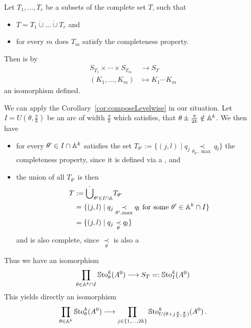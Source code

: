 \begin{cor}\label{cor:composeLevelwise}
  Let $T_1,\dots,T_r$ be a subsets of the complete set $T$, such that
  \begin{itemize}
    \item $T=T_1\dot\cup\dots\dot\cup T_r$ and
    \item for every $m$ does $T_m$ satisfy the completeness property.
  \end{itemize}
  Then is by
  \begin{align*}
    S_{T_1}\times\cdots\times S_{T_m} &\longrightarrow S_T
  \\(K_1,\dots,K_m) &\longmapsto K_1\cdots K_m
  \end{align*}
  an isomorphism defined.
\end{cor}
We can apply the Corollary~\ref{cor:composeLevelwise} in our situation. Let
$I=U(\theta,\frac{\pi}{k})$ be an arc of width $\frac{\pi}{k}$ which satisfies,
that $\theta\pm\frac{\pi}{2k}\notin\mathbb{A}^k$.
We then have
\begin{itemize}
  \item for every $\theta'\in I\cap \mathbb{A}^k$ satisfies the set
    $T_{\theta'}:=\{(j,l)\mid q_j\underset{\theta_{\theta'},\max}{\prec}q_l\}$
    the completeness property, since it is defined via a , and
  \item the union of all $T_{\theta'}$ is then
    \begin{align*}
      T&:=\dot\bigcup_{\theta'\in I\cap\mathbb{A}}T_{\theta'}
      \\&=\{(j,l) \mid q_j \underset{\theta',\max}{\prec} q_l
          \text{~for some~}\theta'\in\mathbb{A}^k\cap I \}
      \\&=\{(j,l) \mid q_j \underset{\theta}{\prec} q_l \}
    \end{align*}
    and is also complete, since $\underset{\theta}{\prec}$ is also a
\end{itemize}
Thus we have an isomorphism
\[
  \prod_{\theta\in\mathbb{A}^k\cap I}\operatorname{\mathbb{S}to}_\theta^k(A^0)
  \longrightarrow
  S_T=:\operatorname{\mathbb{S}to}_I^k(A^0)
\]
This yields directly an isomorphism
\[
  \prod_{\theta\in\mathbb{A}^k}\operatorname{\mathbb{S}to}_\theta^k(A^0)
  \longrightarrow
  \prod_{j\in\{1,\dots,2k\}}
  \operatorname{\mathbb{S}to}_{U(\theta+j\frac{\pi}{k},\frac{\pi}{k})}^k(A^0) \,.
\]

